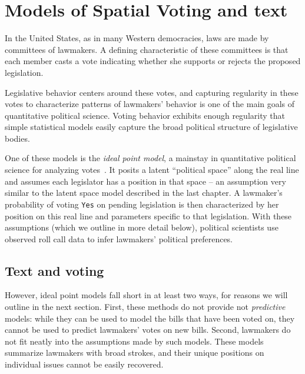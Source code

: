 \chapter{Models of Spatial Voting and text}
\label{chapter:spatial_voting}

In the United States, as in many Western democracies, laws are made by
committees of lawmakers.  A defining characteristic of these
committees is that each member casts a vote indicating whether she
supports or rejects the proposed legislation.

Legislative behavior centers around these votes, and capturing
regularity in these votes to characterize patterns of lawmakers'
behavior is one of the main goals of quantitative political science.
Voting behavior exhibits enough regularity that simple statistical
models easily capture the broad political structure of legislative
bodies.

One of these models is the \emph{ideal point model}, a mainstay in
quantitative political science for analyzing
votes~\citep{clinton:2004}.  It posits a latent ``political space''
along the real line and assumes each legislator has a position in that
space -- an assumption very similar to the latent space model
described in the last chapter.
A lawmaker's probability of voting \verb!Yes! on
pending legislation is then characterized by her position on this real
line and parameters specific to that legislation.  With these
assumptions (which we outline in more detail below), political
scientists use observed roll call data to infer lawmakers' political
preferences.

\section*{Text and voting}
However, ideal point models fall short in at least two ways, for
reasons we will outline in the next section.  First, these methods do
not provide not \emph{predictive} models: while they can be used to
model the bills that have been voted on, they cannot be used to
predict lawmakers' votes on new bills.  Second, lawmakers do not fit
neatly into the assumptions made by such models.  These models
summarize lawmakers with broad strokes, and their unique positions on
individual issues cannot be easily recovered.


